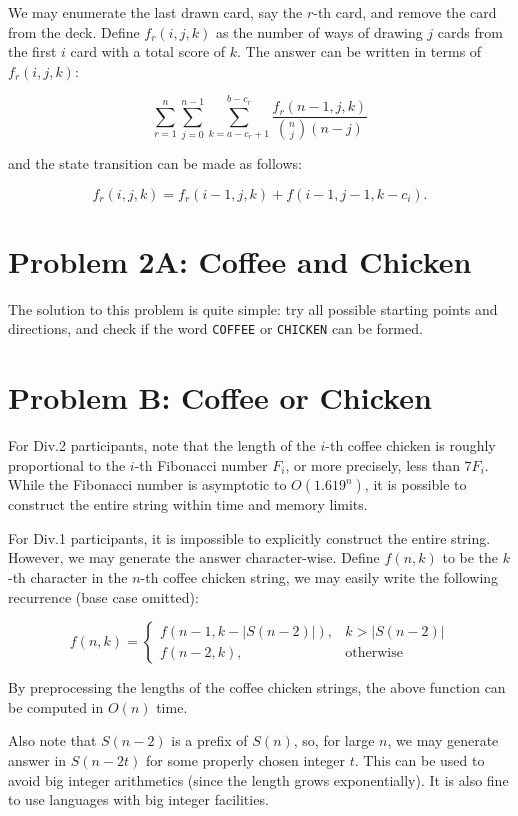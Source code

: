 \documentclass[a4paper,10.5pt,twoside]{article}
\begin{document}
We may enumerate the last drawn card, say the $r$-th card, and remove the card from the deck. Define $f_r(i, j, k)$ as the number of ways of drawing $j$ cards from the first $i$ card with a total score of $k$. The answer can be written in terms of $f_r(i, j, k)$:

$$ \sum_{r = 1}^n \sum_{j=0}^{n-1} \sum_{k = a-c_r+1}^{b-c_r} \frac{f_r(n-1, j, k)}{\binom{n}{j} (n-j)} $$

and the state transition can be made as follows:

$$ f_r(i, j, k) = f_r(i-1, j, k) + f(i-1, j-1, k-c_i). $$

\section*{Problem 2A: Coffee and Chicken}
The solution to this problem is quite simple: try all possible starting points and directions, and check if the word \texttt{COFFEE} or \texttt{CHICKEN} can be formed.

\section*{Problem B: Coffee or Chicken}
For Div.2 participants, note that the length of the $i$-th coffee chicken is roughly proportional to the $i$-th Fibonacci number $F_i$, or more precisely, less than $7F_i$. While the Fibonacci number is asymptotic to $O(1.619^n)$, it is possible to construct the entire string within time and memory limits.

For Div.1 participants, it is impossible to explicitly construct the entire string. However, we may generate the answer character-wise. Define $f(n, k)$ to be the $k$-th character in the $n$-th coffee chicken string, we may easily write the following recurrence (base case omitted):

$$
f(n, k) = \begin{cases}
	f(n-1, k-|S(n-2)|), & k > |S(n-2)| \\
	f(n-2, k), & \text{otherwise}
\end{cases}
$$

By preprocessing the lengths of the coffee chicken strings, the above function can be computed in $O(n)$ time.

Also note that $S(n-2)$ is a prefix of $S(n)$, so, for large $n$, we may generate answer in $S(n-2t)$ for some properly chosen integer $t$. This can be used to avoid big integer arithmetics (since the length grows exponentially). It is also fine to use languages with big integer facilities.
\end{document}
